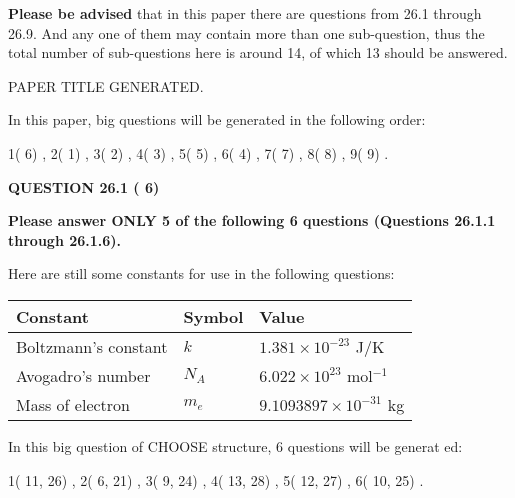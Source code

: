 \documentclass[12pt]{article}
\begin{document}
 
{\textbf{\large{Please be advised}}} that in this paper there are questions from
26.1 through
26.9.
And any one of them may contain more than one sub-question, thus the total number
of sub-questions here is around 14, of which
13 should be answered.
 
\vspace{0.3in}
 
 
   
   
 PAPER TITLE GENERATED.
   
   
   
\vspace{0.2in}
   
In this paper, big questions will be generated in the following order: 
   
   
            1(          6)
 ,
            2(          1)
 ,
            3(          2)
 ,
            4(          3)
 ,
            5(          5)
 ,
            6(          4)
 ,
            7(          7)
 ,
            8(          8)
 ,
            9(          9)
 .
  
\vspace{0.2in}
  
{\textbf{\Large{QUESTION
26.1 
 (          6)
}}}
  
  
 
{\textbf{\Large{Please answer ONLY
5 of the following
6 questions (Questions
26.1.1 through
26.1.6). }}}
 
Here are still some constants for use in the following questions:
 
 
\noindent\begin{tabular}{|l|l|l|}
\hline
Constant & Symbol & Value \\
\hline
 
Boltzmann's constant &
$k$ &
 $ 1.381 \times 10^{-23} $
J/K \\
\hline
 
Avogadro's number &
$N_A$ &
 $ 6.022 \times 10^{23} $
mol$^{-1}$ \\
\hline
 
Mass of electron &
$m_e$ &
 $ 9.1093897 \times 10^{-31} $
kg \\
\hline
 
\end{tabular}
 
   
\vspace{0.2in}
   
 In this big question of CHOOSE structure,           6 questions will be generat
 ed: 
  
  
            1(         11,         26)
 ,
            2(          6,         21)
 ,
            3(          9,         24)
 ,
            4(         13,         28)
 ,
            5(         12,         27)
 ,
            6(         10,         25)
 .
  
\end{document}
